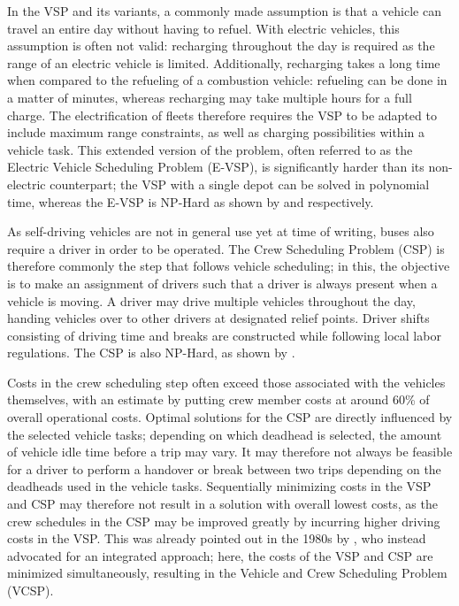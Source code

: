 \documentclass[]{article}
\begin{document}
In the VSP and its variants, a commonly made assumption is that a vehicle can travel an entire day without having to refuel. With electric vehicles, this assumption is often not valid: recharging throughout the day is required as the range of an electric vehicle is limited. Additionally, recharging takes a long time when compared to the refueling of a combustion vehicle: refueling can be done in a matter of minutes, whereas recharging may take multiple hours for a full charge. The electrification of fleets therefore requires the VSP to be adapted to include maximum range constraints, as well as charging possibilities within a vehicle task. This extended version of the problem, often referred to as the Electric Vehicle Scheduling Problem (E-VSP), is significantly harder than its non-electric counterpart; the VSP with a single depot can be solved in polynomial time, whereas the E-VSP is NP-Hard as shown by \citet{Bunte2009} and \citet{Sassi2014} respectively.

As self-driving vehicles are not in general use yet at time of writing, buses also require a driver in order to be operated. The Crew Scheduling Problem (CSP) is therefore commonly the step that follows vehicle scheduling; in this, the objective is to make an assignment of drivers such that a driver is always present when a vehicle is moving. A driver may drive multiple vehicles throughout the day, handing vehicles over to other drivers at designated relief points. Driver shifts consisting of driving time and breaks are constructed while following local labor regulations. The CSP is also NP-Hard, as shown by \citet{Fischetti1989}.

Costs in the crew scheduling step often exceed those associated with the vehicles themselves, with an estimate by \citet{Perumal2019Crew} putting crew member costs at around 60\% of overall operational costs. Optimal solutions for the CSP are directly influenced by the selected vehicle tasks; depending on which deadhead is selected, the amount of vehicle idle time before a trip may vary. It may therefore not always be feasible for a driver to perform a handover or break between two trips depending on the deadheads used in the vehicle tasks. Sequentially minimizing costs in the VSP and CSP may therefore not result in a solution with overall lowest costs, as the crew schedules in the CSP may be improved greatly by incurring higher driving costs in the VSP. This was already pointed out in the 1980s by \citet{Bodin1983}, who instead advocated for an integrated approach; here, the costs of the VSP and CSP are minimized simultaneously, resulting in the Vehicle and Crew Scheduling Problem (VCSP). \\
\end{document}
